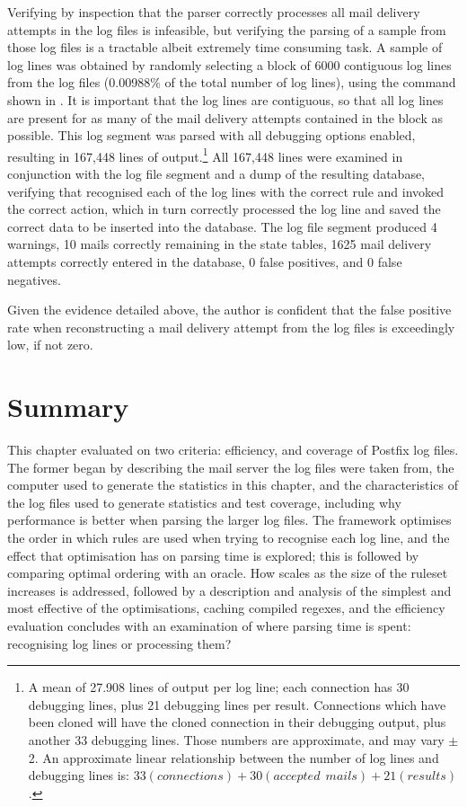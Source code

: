 Verifying by inspection that the parser correctly processes all
\numberOFconnectionsINlogFILES{} mail delivery attempts in the
\numberOFlogFILES{} log files is infeasible, but verifying the parsing of a
sample from those log files is a tractable albeit extremely time consuming
task.  A sample of log lines was obtained by randomly selecting a block of
6000 contiguous log lines from the \numberOFlogFILES{} log files (0.00988\%
of the total number of log lines), using the command shown in
.  It is
important that the log lines are contiguous, so that all log lines are
present for as many of the mail delivery attempts contained in the block as
possible.  This log segment was parsed with all debugging options enabled,
resulting in 167,448 lines of output.\footnote{A mean of 27.908 lines of
output per log line; each connection has 30 debugging lines, plus 21
debugging lines per result.  Connections which have been cloned will have
the cloned connection in their debugging output, plus another 33 debugging
lines.  Those numbers are approximate, and may vary $\pm{}$ 2.  An
approximate linear relationship between the number of log lines and
debugging lines is: $33(connections) + 30(accepted~~mails) + 21(results)$.}
All 167,448 lines were examined in conjunction with the log file segment
and a dump of the resulting database, verifying that \parsername{}
recognised each of the log lines with the correct rule and invoked the
correct action, which in turn correctly processed the log line and saved
the correct data to be inserted into the database.  The log file segment
produced 4 warnings, 10 mails correctly remaining in the state tables, 1625
mail delivery attempts correctly entered in the database, 0 false
positives, and 0 false negatives.

Given the evidence detailed above, the author is confident that the false
positive rate when reconstructing a mail delivery attempt from the
\numberOFlogFILES{} log files is exceedingly low, if not zero.

\section{Summary}

This chapter evaluated \parsername{} on two criteria: efficiency, and
coverage of Postfix log files.  The former began by describing the mail
server the log files were taken from, the computer used to generate the
statistics in this chapter, and the characteristics of the
\numberOFlogFILES{} log files used to generate statistics and test
coverage, including why performance is better when parsing the larger log
files.  The framework optimises the order in which rules are used when
trying to recognise each log line, and the effect that optimisation has on
parsing time is explored; this is followed by comparing optimal ordering
with an oracle.  How \parsername{} scales as the size of the ruleset
increases is addressed, followed by a description and analysis of the
simplest and most effective of the optimisations, caching compiled regexes,
and the efficiency evaluation concludes with an examination of where
parsing time is spent: recognising log lines or processing them?

